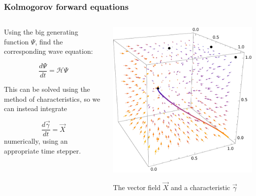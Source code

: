 \documentclass{beamer}
\begin{document}
\begin{frame}
    \frametitle{Kolmogorov forward equations}

    \begin{columns}
        \begin{column}{0.5\textwidth}
    Using the big generating function $\Psi$, find the corresponding wave
    equation:

    \begin{equation}
        \frac{d \Psi}{ dt} = \mathcal{H} \Psi
    \end{equation}

    This can be solved using the method of characteristics, so we can instead
    integrate

    \begin{equation}
        \frac{d \vec{\gamma}}{ dt} = \vec{X}
    \end{equation}
    numerically, using an appropriate time stepper.


        \end{column}
        \begin{column}{0.5\textwidth}
            \includegraphics[width=\textwidth]{figures/flowcube1}

            \;

            The vector field $\vec{X}$ and a characteristic $\vec{\gamma}$
        \end{column}
    \end{columns}
\end{frame}
\end{document}
